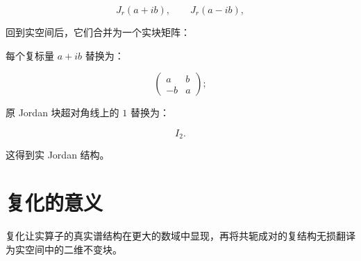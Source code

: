 \[
J_r(a+ib),
\qquad
J_r(a-ib),
\]

回到实空间后，它们合并为一个实块矩阵：

\begin{jitem}
\item %
每个复标量 $a+ib$ 替换为：

\[
\begin{pmatrix}
a&b\\
-b&a
\end{pmatrix};
\]
\item %
原 Jordan 块超对角线上的 $1$ 替换为：

\[
I_2.
\]
\end{jitem}

这得到实 Jordan 结构。

\section{复化的意义}

复化让实算子的真实谱结构在更大的数域中显现，再将共轭成对的复结构无损翻译为实空间中的二维不变块。
